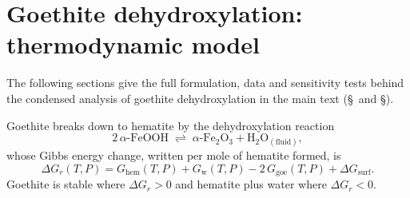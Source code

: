 \section{Goethite dehydroxylation: thermodynamic model}\label{sec:gtsi-thermo}

The following sections give the full formulation, data and sensitivity tests behind the
condensed analysis of goethite dehydroxylation in the main text (\S\MainRefMethodsKinetics\ and
\S\MainRefDiscussionConversion).

Goethite breaks down to hematite by the dehydroxylation reaction
\begin{equation}
  2\,\alpha\text{-FeOOH} \;\rightleftharpoons\; \alpha\text{-Fe}_2\text{O}_3 + \text{H}_2\text{O}_{(\text{fluid})},
  \label{eq:gtsi_rxn}
\end{equation}
whose Gibbs energy change, written per mole of hematite formed, is
\begin{equation}
  \Delta G_r(T,P) = G_{\mathrm{hem}}(T,P) + G_{\mathrm{w}}(T,P) - 2\,G_{\mathrm{goe}}(T,P) + \Delta G_{\mathrm{surf}} .
  \label{eq:gtsi_dGr}
\end{equation}
Goethite is stable where $\Delta G_r>0$ and hematite plus water where $\Delta G_r<0$.

